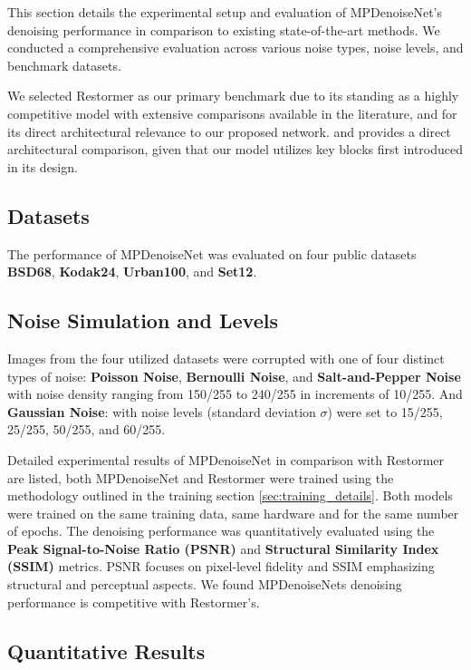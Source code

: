 This section details the experimental setup and evaluation of MPDenoiseNet's denoising performance in comparison to existing state-of-the-art methods. We conducted a comprehensive evaluation across various noise types, noise levels, and benchmark datasets.

We selected Restormer\cite{Zamir2022} as our primary benchmark due to its standing as a highly competitive model with extensive comparisons available in the literature, and for its direct architectural relevance to our proposed network. and provides a direct architectural comparison, given that our model utilizes key blocks first introduced in its design.
\subsection{Datasets}

The performance of MPDenoiseNet was evaluated on four public datasets \textbf{BSD68}\cite{Martin01}, \textbf{Kodak24}\cite{Kodak}, \textbf{Urban100}\cite{Huang2015}, and \textbf{Set12}\cite{Set12}.

\subsection{Noise Simulation and Levels}

Images from the four utilized datasets were corrupted with one of four distinct types of noise: \textbf{Poisson Noise}, \textbf{Bernoulli Noise}, and \textbf{Salt-and-Pepper Noise} with noise density ranging from 150/255 to 240/255 in increments of 10/255. And \textbf{Gaussian Noise}: with noise levels (standard deviation $\sigma$) were set to 15/255, 25/255, 50/255, and 60/255.

Detailed experimental results of MPDenoiseNet in comparison with Restormer are listed, both MPDenoiseNet and Restormer were trained using the methodology outlined in the training section \ref{sec:training_details}. Both models were trained on the same training data, same hardware and for the same number of epochs. The denoising performance was quantitatively evaluated using the \textbf{Peak Signal-to-Noise Ratio (PSNR)} and \textbf{Structural Similarity Index (SSIM)} metrics. PSNR focuses on pixel-level fidelity and SSIM emphasizing structural and perceptual aspects.  We found MPDenoiseNets denoising performance is competitive with Restormer's. 
\subsection{Quantitative Results}

